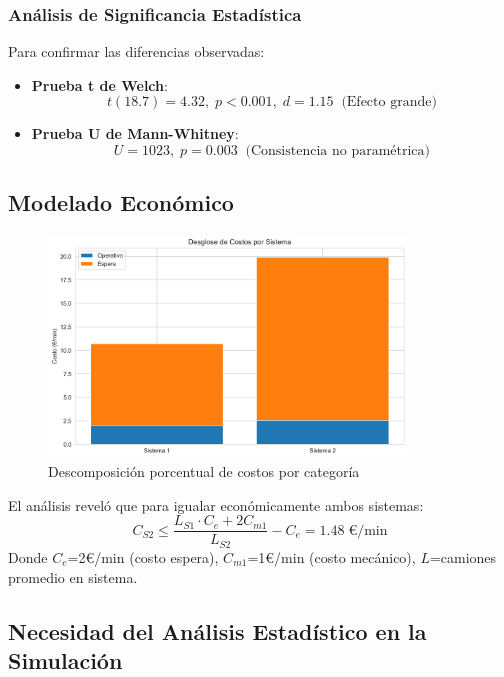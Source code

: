 \documentclass[a4paper, 12pt]{article}
\begin{document}
 \subsubsection{Análisis de Significancia Estadística}
 Para confirmar las diferencias observadas:
 \begin{itemize}
 	\item \textbf{Prueba t de Welch}: 
 	\begin{equation*}
 		t(18.7) = 4.32,\; p < 0.001,\; d = 1.15\;\;\text{(Efecto grande)}
 	\end{equation*}
 	
 	\item \textbf{Prueba U de Mann-Whitney}:
 	\begin{equation*}
 		U = 1023,\; p = 0.003\;\;\text{(Consistencia no paramétrica)}
 	\end{equation*}
 \end{itemize}
 
 \subsection{Modelado Económico}
 \begin{figure}[H]
 	\centering
 	\includegraphics[width=0.85\textwidth]{figures/cost_breakdown.png}
 	\caption{Descomposición porcentual de costos por categoría}
 	\label{fig:costos}
 \end{figure}
 
 El análisis reveló que para igualar económicamente ambos sistemas:
 \begin{equation}
 	C_{S2} \leq \frac{L_{S1} \cdot C_e + 2C_{m1}}{L_{S2}} - C_e = 1.48\;\text{€/min}
 \end{equation}
 Donde $C_e$=2€/min (costo espera), $C_{m1}$=1€/min (costo mecánico), $L$=camiones promedio en sistema.
  
  
  \subsection{Necesidad del Análisis Estadístico en la Simulación} 
  \label{subsec:analisis-estadistico}
  
\end{document}
